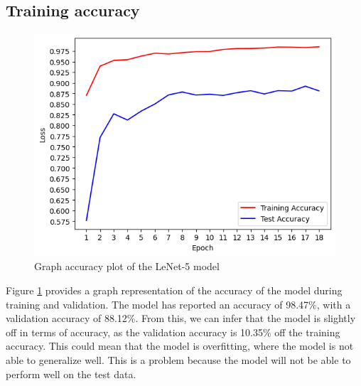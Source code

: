 \newpage
\subsection{Training accuracy}

\begin{figure}[h]
    \centering
    \includegraphics[scale=0.8]{mainmatter/images/results/acc-sep.png}
    \caption{Graph accuracy plot of the LeNet-5 model}
    \label{fig:acc}
\end{figure}

Figure \ref{fig:acc} provides a graph representation of the accuracy of the model during training and validation. The model has reported an accuracy of 98.47\%, with a validation accuracy of 88.12\%. From this, we can infer that the model is slightly off in terms of accuracy, as the validation accuracy is 10.35\% off the training accuracy. This could mean that the model is overfitting, where the model is not able to generalize well. This is a problem because the model will not be able to perform well on the test data.

